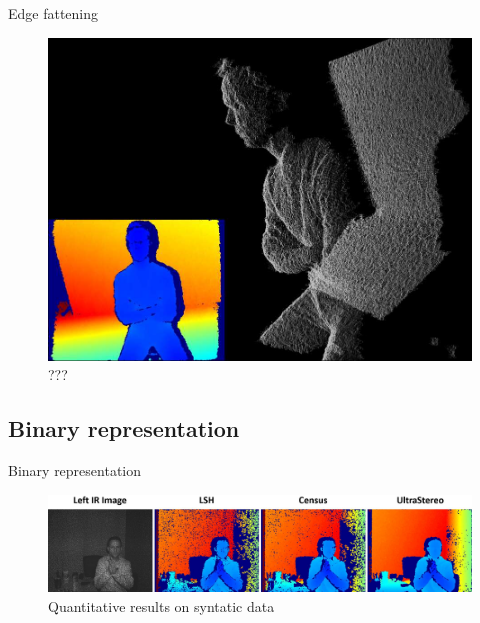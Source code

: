 \begin{frame}{Edge fattening}

\begin{figure}
\includegraphics[scale=0.15]{pictures/fig6}
\caption{???}
\end{figure}
\end{frame}

\subsection{Binary representation}
\begin{frame}{Binary representation}
\begin{figure}
\includegraphics[scale=0.1]{pictures/fig7}
\caption{Quantitative results on syntatic data}
\end{figure}
\end{frame}

